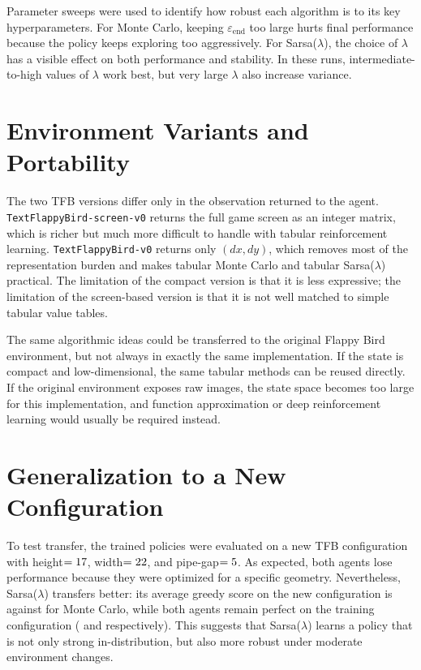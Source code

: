 \documentclass[10pt,a4paper,twocolumn]{article}
\begin{document}
Parameter sweeps were used to identify how robust each algorithm is to its key hyperparameters. For Monte Carlo, keeping $\varepsilon_{\text{end}}$ too large hurts final performance because the policy keeps exploring too aggressively. For Sarsa($\lambda$), the choice of $\lambda$ has a visible effect on both performance and stability. In these runs, intermediate-to-high values of $\lambda$ work best, but very large $\lambda$ also increase variance.

\section*{Environment Variants and Portability}
The two TFB versions differ only in the observation returned to the agent. \texttt{TextFlappyBird-screen-v0} returns the full game screen as an integer matrix, which is richer but much more difficult to handle with tabular reinforcement learning. \texttt{TextFlappyBird-v0} returns only $(dx,dy)$, which removes most of the representation burden and makes tabular Monte Carlo and tabular Sarsa($\lambda$) practical. The limitation of the compact version is that it is less expressive; the limitation of the screen-based version is that it is not well matched to simple tabular value tables.

The same algorithmic ideas could be transferred to the original Flappy Bird environment, but not always in exactly the same implementation. If the state is compact and low-dimensional, the same tabular methods can be reused directly. If the original environment exposes raw images, the state space becomes too large for this implementation, and function approximation or deep reinforcement learning would usually be required instead.

\section*{Generalization to a New Configuration}
To test transfer, the trained policies were evaluated on a new TFB configuration with height$=17$, width$=22$, and pipe-gap$=5$. As expected, both agents lose performance because they were optimized for a specific geometry. Nevertheless, Sarsa($\lambda$) transfers better: its average greedy score on the new configuration is \textbf{\SarsaTransferScore{}} against \textbf{\MCTransferScore{}} for Monte Carlo, while both agents remain perfect on the training configuration (\MCTrainScore{} and \SarsaTrainScore{} respectively). This suggests that Sarsa($\lambda$) learns a policy that is not only strong in-distribution, but also more robust under moderate environment changes.
\end{document}
